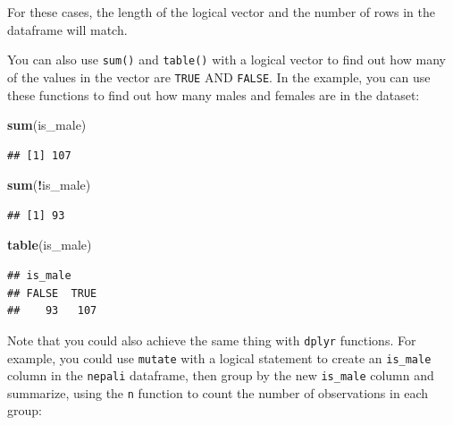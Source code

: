 \documentclass[]{book}
\makeatletter
\newenvironment{Shaded}{\begin{snugshade}}{\end{snugshade}}
\newcommand{\KeywordTok}[1]{\textcolor[rgb]{0.13,0.29,0.53}{\textbf{#1}}}
\newcommand{\DataTypeTok}[1]{\textcolor[rgb]{0.13,0.29,0.53}{#1}}
\newcommand{\StringTok}[1]{\textcolor[rgb]{0.31,0.60,0.02}{#1}}
\newcommand{\OperatorTok}[1]{\textcolor[rgb]{0.81,0.36,0.00}{\textbf{#1}}}
\newcommand{\NormalTok}[1]{#1}
\newenvironment{kframe}{%
\medskip{}
\setlength{\fboxsep}{.8em}
 \def\at@end@of@kframe{}%
 \ifinner\ifhmode%
  \def\at@end@of@kframe{\end{minipage}}%
  \begin{minipage}{\columnwidth}%
 \fi\fi%
 \def\FrameCommand##1{\hskip\@totalleftmargin \hskip-\fboxsep
 \colorbox{shadecolor}{##1}\hskip-\fboxsep
     \hskip-\linewidth \hskip-\@totalleftmargin \hskip\columnwidth}%
 \MakeFramed {\advance\hsize-\width
   \@totalleftmargin\z@ \linewidth\hsize
   \@setminipage}}%
 {\par\unskip\endMakeFramed%
 \at@end@of@kframe}
\renewenvironment{Shaded}{\begin{kframe}}{\end{kframe}}
\theoremstyle{definition}
\theoremstyle{definition}
\theoremstyle{definition}
\theoremstyle{remark}
\makeatother
\begin{document}
For these cases, the length of the logical vector and the number of rows
in the dataframe will match.

You can also use \texttt{sum()} and \texttt{table()} with a logical
vector to find out how many of the values in the vector are
\texttt{TRUE} AND \texttt{FALSE}. In the example, you can use these
functions to find out how many males and females are in the dataset:

\begin{Shaded}
\begin{Highlighting}[]
\KeywordTok{sum}\NormalTok{(is_male)}
\end{Highlighting}
\end{Shaded}

\begin{verbatim}
## [1] 107
\end{verbatim}

\begin{Shaded}
\begin{Highlighting}[]
\KeywordTok{sum}\NormalTok{(}\OperatorTok{!}\NormalTok{is_male)}
\end{Highlighting}
\end{Shaded}

\begin{verbatim}
## [1] 93
\end{verbatim}

\begin{Shaded}
\begin{Highlighting}[]
\KeywordTok{table}\NormalTok{(is_male)}
\end{Highlighting}
\end{Shaded}

\begin{verbatim}
## is_male
## FALSE  TRUE 
##    93   107
\end{verbatim}

Note that you could also achieve the same thing with \texttt{dplyr}
functions. For example, you could use \texttt{mutate} with a logical
statement to create an \texttt{is\_male} column in the \texttt{nepali}
dataframe, then group by the new \texttt{is\_male} column and summarize,
using the \texttt{n} function to count the number of observations in
each group:

\begin{Shaded}
\end{Shaded}
\end{document}
